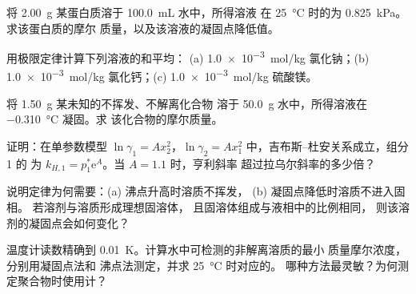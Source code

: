\begin{exercise}[$\star\star$]\label{exo:b2:chemical-potential:7}
将 \qty{2.00}{g} 某蛋白质溶于 \qty{100.0}{mL} 水中，所得溶液
在 \qty{25}{\celsius} 时的为 \qty{0.825}{kPa}。求该蛋白质的摩尔
质量，以及该溶液的凝固点降低值。
\end{exercise}

\begin{exercise}[$\star\star$]\label{exo:b2:chemical-potential:8}
用极限定律计算下列溶液的和平均：
(a) \qty{1.0e-3}{mol/kg} 氯化钠；(b) \qty{1.0e-3}{mol/kg}
氯化钙；(c) \qty{1.0e-3}{mol/kg} 硫酸镁。
\end{exercise}

\begin{exercise}[$\star\star$]\label{exo:b2:chemical-potential:9}
将 \qty{1.50}{g} 某未知的不挥发、不解离化合物
溶于 \qty{50.0}{g} 水中，所得溶液在 \qty{-0.310}{\celsius} 凝固。求
该化合物的摩尔质量。
\end{exercise}

\begin{exercise}[$\star\star\star$]\label{exo:b2:chemical-potential:10}
证明：在单参数模型 $\ln\gamma_1 = Ax_2^2$，$\ln\gamma_2 =
Ax_1^2$ 中，吉布斯–杜安关系成立，组分 1 的
为 $k_{H,1} = p_1^*\mathrm e^A$。当 $A = 1.1$ 时，亨利斜率
超过拉乌尔斜率的多少倍？
\end{exercise}

\begin{exercise}[$\star\star\star$]\label{exo:b2:chemical-potential:11}
说明定律为何需要：(a) 沸点升高时溶质不挥发，
(b) 凝固点降低时溶质不进入固相。
若溶剂与溶质形成理想固溶体，
且固溶体组成与液相中的比例相同，
则该溶剂的凝固点会如何变化？
\end{exercise}

\begin{exercise}[$\star\star\star$]\label{exo:b2:chemical-potential:12}
温度计读数精确到 \qty{0.01}{K}。计算水中可检测的非解离溶质的最小
质量摩尔浓度，分别用凝固点法和
沸点法测定，并求 \qty{25}{\celsius} 时对应的。
哪种方法最灵敏？为何测定聚合物时使用计？
\end{exercise}

